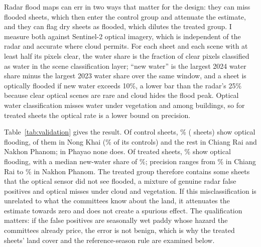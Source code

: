 Radar flood maps can err in two ways that matter for the design: they can miss flooded sheets, which then enter the control group and attenuate the estimate, and they can flag dry sheets as flooded, which dilutes the treated group. I measure both against Sentinel-2 optical imagery, which is independent of the radar and accurate where cloud permits. For each sheet and each scene with at least half its pixels clear, the water share is the fraction of clear pixels classified as water in the scene classification layer; ``new water'' is the largest 2024 water share minus the largest 2023 water share over the same window, and a sheet is optically flooded if new water exceeds 10\%, a lower bar than the radar's 25\% because clear optical scenes are rare and cloud hides the flood peak. Optical water classification misses water under vegetation and among buildings, so for treated sheets the optical rate is a lower bound on precision.

\begin{table}[t]
\centering\footnotesize
\caption{Radar flood maps against Sentinel-2 optical imagery, 2024 primary sample}\label{tab:validation}

\end{table}

Table~\ref{tab:validation} gives the result. Of \radarControls{} control sheets, \valControlContam\% (\valControlContamN{} sheets) show optical flooding, \valNongKhaiContamN{} of them in Nong Khai (\valNongKhaiContam\% of its controls) and the rest in Chiang Rai and Nakhon Phanom; in Phayao none does. Of \radarTreated{} treated sheets, \valTreatedPrec\% show optical flooding, with a median new-water share of \valTreatedNewWater\%; precision ranges from \valChiangRaiPrec\% in Chiang Rai to \valNakhonPhanomPrec\% in Nakhon Phanom. The treated group therefore contains some sheets that the optical sensor did not see flooded, a mixture of genuine radar false positives and optical misses under cloud and vegetation. If this misclassification is unrelated to what the committees know about the land, it attenuates the estimate towards zero and does not create a spurious effect. The qualification matters: if the false positives are seasonally wet paddy whose hazard the committees already price, the error is not benign, which is why the treated sheets' land cover and the reference-season rule are examined below.


